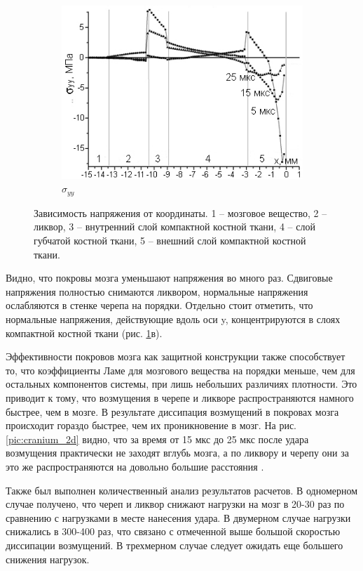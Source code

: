 \begin{figure}[h]
\begin{subfigure}[b]{0.6\textwidth}
\includegraphics[width=\textwidth]{png/cranium/2d-syy-1d.png}
\caption{$\sigma_{yy}$}
\end{subfigure}
\caption{Зависимость напряжения от координаты. 1 -- мозговое вещество, 2 -- ликвор, 3 -- внутренний слой компактной костной ткани, 4 -- слой губчатой костной ткани, 5 -- внешний слой компактной костной ткани.}
\label{pic:cranium_2d_1d}
\end{figure}

Видно, что покровы мозга уменьшают напряжения во много раз. Сдвиговые напряжения полностью снимаются ликвором, нормальные напряжения ослабляются в стенке черепа на порядки. Отдельно стоит отметить, что нормальные напряжения, действующие вдоль оси y, концентрируются в слоях компактной костной ткани (рис. \ref{pic:cranium_2d_1d}в).

Эффективности покровов мозга как защитной конструкции также способствует то, что коэффициенты Ламе для мозгового вещества на порядки меньше, чем для остальных компонентов системы, при лишь небольших различиях плотности. Это приводит к тому, что возмущения в черепе и ликворе распространяются намного быстрее, чем в мозге. В результате диссипация возмущений в покровах мозга происходит гораздо быстрее, чем их проникновение в мозг. На рис. \ref{pic:cranium_2d} видно, что за время от 15 мкс до 25 мкс после удара возмущения практически не заходят вглубь мозга, а по ликвору и черепу они за это же распространяются на довольно большие расстояния \cite{a10, a11}.

Также был выполнен количественный анализ результатов расчетов. В одномерном случае получено, что череп и ликвор снижают нагрузки на мозг в 20-30 раз по сравнению с нагрузками в месте нанесения удара. В двумерном случае нагрузки снижались в 300-400 раз, что связано с отмеченной выше большой скоростью диссипации возмущений. В трехмерном случае следует ожидать еще большего снижения нагрузок. 

